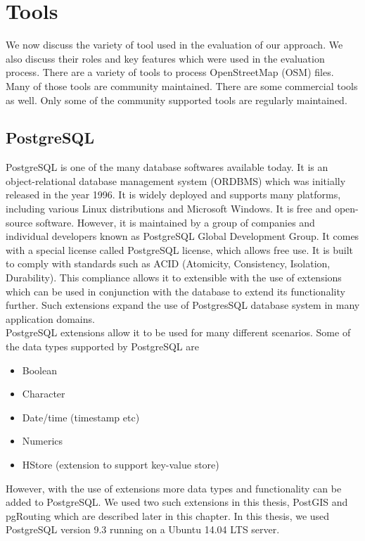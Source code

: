 \section{Tools}\label{tools}
We now discuss the variety of tool used in the evaluation of our approach. We also discuss their roles and key features which were used in the evaluation process. There are a variety of tools to process OpenStreetMap (OSM) files. Many of those tools are community maintained. There are some commercial tools as well. Only some of the community supported tools are regularly maintained. 

\subsection{PostgreSQL}\label{postgres}
PostgreSQL \cite{postgresql} is one of the many database softwares available today. It is an object-relational database management system (ORDBMS) which was initially released in the year 1996. It is widely deployed and supports many platforms, including various Linux distributions and Microsoft Windows. It is free and open-source software. However, it is maintained by a group of companies and individual developers known as PostgreSQL Global Development Group. It comes with a special license called PostgreSQL license, which allows free use. It is built to comply with standards such as ACID (Atomicity, Consistency, Isolation, Durability). This compliance allows it to extensible with the use of extensions which can be used in conjunction with the database to extend its functionality further. Such extensions expand the use of PostgresSQL database system in many application domains.
\\

PostgreSQL extensions allow it to be used for many different scenarios. Some of the data types supported by PostgreSQL are \begin{itemize}
\item Boolean
\item Character
\item Date/time (timestamp etc)
\item Numerics
\item HStore (extension to support key-value store)
\end{itemize} 
However, with the use of extensions more data types and functionality can be added to PostgreSQL. We used two such extensions in this thesis, PostGIS and pgRouting which are described later in this chapter. In this thesis, we used PostgreSQL version 9.3 running on a Ubuntu 14.04 LTS server.
